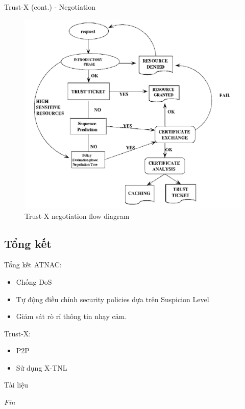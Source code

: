 \documentclass[11pt]{beamer}
\begin{document}
\begin{frame}{Trust-X (cont.) - Negotiation}
\begin{figure}
\centering
\includegraphics[scale=.5]{img/trustx-architecture.png}
\caption{Trust-X negotiation flow diagram}
\label{fig:trust-x-architecture}
\end{figure}
\end{frame}

\subsection{Tổng kết}
\begin{frame}{Tổng kết}
ATNAC:
\begin{itemize}
\item Chống DoS
\item Tự động điều chỉnh security policies dựa trên Suspicion Level
\item Giám sát rò rỉ thông tin nhạy cảm.
\end{itemize}
Trust-X:
\begin{itemize}
\item P2P
\item Sử dụng X-TNL
\end{itemize}
\end{frame}

\begin{frame}[allowframebreaks]{Tài liệu}
\printbibliography
\end{frame}

\begin{frame}{}
\centering \Large
\emph{Fin}
\end{frame}
\end{document}
